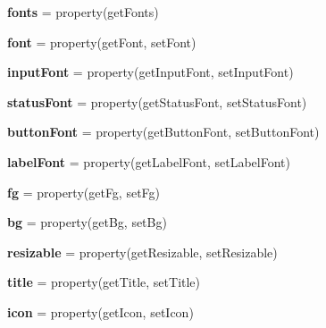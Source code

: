 \begin{DoxyCompactItemize}
\item 
\mbox{\label{classappjar_1_1gui_ad2baeca98b826eaa564ca801702ab054}} 
{\bfseries fonts} = property(get\+Fonts)
\item 
\mbox{\label{classappjar_1_1gui_a848c886a0eb3d21eb94bbe11e7f31426}} 
{\bfseries font} = property(get\+Font, set\+Font)
\item 
\mbox{\label{classappjar_1_1gui_af39bdc2a2e3e14d10f323bd8f4e6004b}} 
{\bfseries input\+Font} = property(get\+Input\+Font, set\+Input\+Font)
\item 
\mbox{\label{classappjar_1_1gui_a409f6ab4245a84be6c910143678e3369}} 
{\bfseries status\+Font} = property(get\+Status\+Font, set\+Status\+Font)
\item 
\mbox{\label{classappjar_1_1gui_a110305342af98a0def4ac16522eaa3a6}} 
{\bfseries button\+Font} = property(get\+Button\+Font, set\+Button\+Font)
\item 
\mbox{\label{classappjar_1_1gui_adb4e27c8043c111a04d6cfa8ce5b5bac}} 
{\bfseries label\+Font} = property(get\+Label\+Font, set\+Label\+Font)
\item 
\mbox{\label{classappjar_1_1gui_ac97c6050252496d84a780b40cd1fd4c0}} 
{\bfseries fg} = property(get\+Fg, set\+Fg)
\item 
\mbox{\label{classappjar_1_1gui_aea60ab5eb4ef5ab098e81ab65ce778e1}} 
{\bfseries bg} = property(get\+Bg, set\+Bg)
\item 
\mbox{\label{classappjar_1_1gui_a0b444d6619a319b1639f8b30965fdcd9}} 
{\bfseries resizable} = property(get\+Resizable, set\+Resizable)
\item 
\mbox{\label{classappjar_1_1gui_a0bf097284c03411e04fb46341a4ab26a}} 
{\bfseries title} = property(get\+Title, set\+Title)
\item 
\mbox{\label{classappjar_1_1gui_a7d379b7b0ce988693071619e97265378}} 
{\bfseries icon} = property(get\+Icon, set\+Icon)

\end{DoxyCompactItemize}
